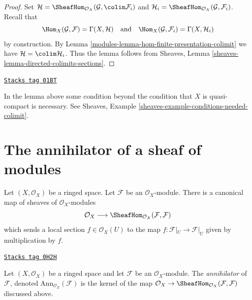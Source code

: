 \begin{proof}

Set
$\mathcal{H} = \SheafHom_{\mathcal{O}_X}(\mathcal{G}, \colim \mathcal{F}_i)$
and $\mathcal{H}_i = \SheafHom_{\mathcal{O}_X}(\mathcal{G}, \mathcal{F}_i)$.
Recall that
$$
\Hom_X(\mathcal{G}, \mathcal{F}) = \Gamma(X, \mathcal{H})
\quad\text{and}\quad
\Hom_X(\mathcal{G}, \mathcal{F}_i) = \Gamma(X, \mathcal{H}_i)
$$
by construction. By Lemma \ref{modules-lemma-hom-finite-presentation-colimit} we have
$\mathcal{H} = \colim \mathcal{H}_i$. Thus the lemma follows from
Sheaves, Lemma \ref{sheaves-lemma-directed-colimits-sections}.
\end{proof}

\begin{remark}
\label{modules-remark-condition-necessary}
\href{https://stacks.math.columbia.edu/tag/01BT}{\texttt{Stacks tag 01BT}}

In the lemma above some condition beyond the condition that $X$
is quasi-compact is necessary. See
Sheaves, Example \ref{sheaves-example-conditions-needed-colimit}.
\end{remark}

\section{The annihilator of a sheaf of modules}
\label{modules-section-annihilator}
Let $(X, \mathcal{O}_X)$ be a ringed space.
Let $\mathcal{F}$ be an $\mathcal{O}_X$-module.
There is a canonical map of sheaves of $\mathcal{O}_X$-modules
$$
\mathcal{O}_X
\longrightarrow
\SheafHom_{\mathcal{O}_X}(\mathcal{F}, \mathcal{F})
$$
which sends a local section $f \in \mathcal{O}_X(U)$ to the map
$f : \mathcal{F}|_U \to \mathcal{F}|_U$ given by multiplication by $f$.

\begin{definition}
\label{modules-definition-annihilator-sheaf}
\href{https://stacks.math.columbia.edu/tag/0H2H}{\texttt{Stacks tag 0H2H}}

Let $(X, \mathcal{O}_X)$ be a ringed space and let $\mathcal{F}$
be an $\mathcal{O}_X$-module. The {\it annihilator} of $\mathcal{F}$,
denoted $\text{Ann}_{\mathcal{O}_X}(\mathcal{F})$
is the kernel of the map
$\mathcal{O}_X \to \SheafHom_{\mathcal{O}_X}(\mathcal{F}, \mathcal{F})$
discussed above.
\end{definition}

